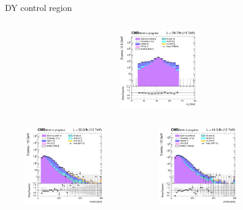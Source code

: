 \documentclass[8pt]{beamer}
\begin{document}
\begin{frame}{DY control region}
\begin{columns}
\begin{column}{0.33\textwidth}
\begin{center}
     			\includegraphics[width=1.0\textwidth, height=95pt]{figs/2018/log_cratio_dyCR_ll_mllpeak.png}
    		\end{center}		
		\end{column}
\end{columns}
\vspace{-5pt}
\begin{columns}
		\begin{column}{0.33\textwidth}
			\begin{center}
     			\includegraphics[width=1.0\textwidth, height=95pt]{figs/2016/log_cratio_dyCR_ll_METcorrected_pt.png}
    		\end{center}		
		\end{column}
		\begin{column}{0.33\textwidth}
			\begin{center}
     			\includegraphics[width=1.0\textwidth, height=95pt]{figs/2017/log_cratio_dyCR_ll_METcorrected_pt.png}
    		\end{center}		
		\end{column}
		\begin{column}{0.33\textwidth}
			\begin{center}

\end{center}
\end{column}
\end{columns}
\end{frame}
\end{document}

